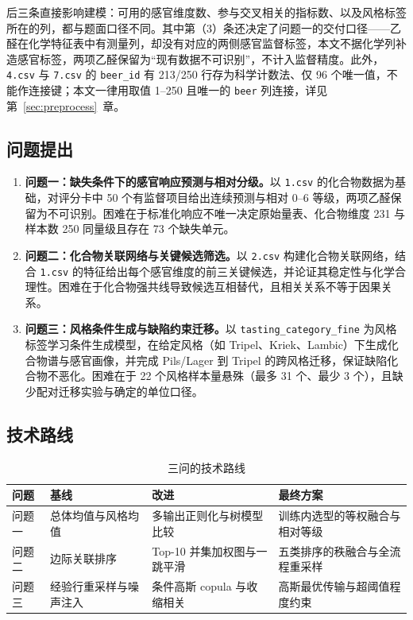 \documentclass[UTF8,a4paper,zihao=-4]{ctexart}
\numberwithin{figure}{section}
\numberwithin{table}{section}
\numberwithin{equation}{section}
\newcommand{\file}[1]{\texttt{#1}}
\begin{document}
后三条直接影响建模：可用的感官维度数、参与交叉相关的指标数、以及风格标签所在的列，都与题面口径不同。其中第（3）条还决定了问题一的交付口径——乙醛在化学特征表中有测量列，却没有对应的两侧感官监督标签，本文不据化学列补造感官标签，两项乙醛保留为“现有数据不可识别”，不计入监督精度。此外，\file{4.csv} 与 \file{7.csv} 的 \file{beer\_id} 有 213/250 行存为科学计数法、仅 96 个唯一值，不能作连接键；本文一律用取值 1--250 且唯一的 \file{beer} 列连接，详见第~\ref{sec:preprocess}~章。

\subsection{问题提出}

\begin{enumerate}[label=（\arabic*）,leftmargin=2.5em,itemsep=2pt]
  \item \textbf{问题一：缺失条件下的感官响应预测与相对分级。}以 \file{1.csv} 的化合物数据为基础，对评分卡中 50 个有监督项目给出连续预测与相对 0--6 等级，两项乙醛保留为不可识别。困难在于标准化响应不唯一决定原始量表、化合物维度 231 与样本数 250 同量级且存在 73 个缺失单元。
  \item \textbf{问题二：化合物关联网络与关键候选筛选。}以 \file{2.csv} 构建化合物关联网络，结合 \file{1.csv} 的特征给出每个感官维度的前三关键候选，并论证其稳定性与化学合理性。困难在于化合物强共线导致候选互相替代，且相关关系不等于因果关系。
  \item \textbf{问题三：风格条件生成与缺陷约束迁移。}以 \file{tasting\_category\_fine} 为风格标签学习条件生成模型，在给定风格（如 Tripel、Kriek、Lambic）下生成化合物谱与感官画像，并完成 Pils/Lager 到 Tripel 的跨风格迁移，保证缺陷化合物不恶化。困难在于 22 个风格样本量悬殊（最多 31 个、最少 3 个），且缺少配对迁移实验与确定的单位口径。
\end{enumerate}

\subsection{技术路线}



\begin{table}[H]
  \centering
  \caption{三问的技术路线}
  \label{tab:roadmap}
  \footnotesize
  \begin{tabularx}{\textwidth}{@{}l >{\hsize=0.82\hsize}X >{\hsize=1.12\hsize}X >{\hsize=1.06\hsize}X@{}}
    \toprule
    问题 & 基线 & 改进 & 最终方案 \\
    \midrule
    问题一 & 总体均值与风格均值 & 多输出正则化与树模型比较 & 训练内选型的等权融合与相对等级 \\
    问题二 & 边际关联排序 & Top-10 并集加权图与一跳平滑 & 五类排序的秩融合与全流程重采样 \\
    问题三 & 经验行重采样与噪声注入 & 条件高斯 copula 与收缩相关 & 高斯最优传输与超阈值程度约束 \\
    \bottomrule
  \end{tabularx}
\end{table}
\end{document}
